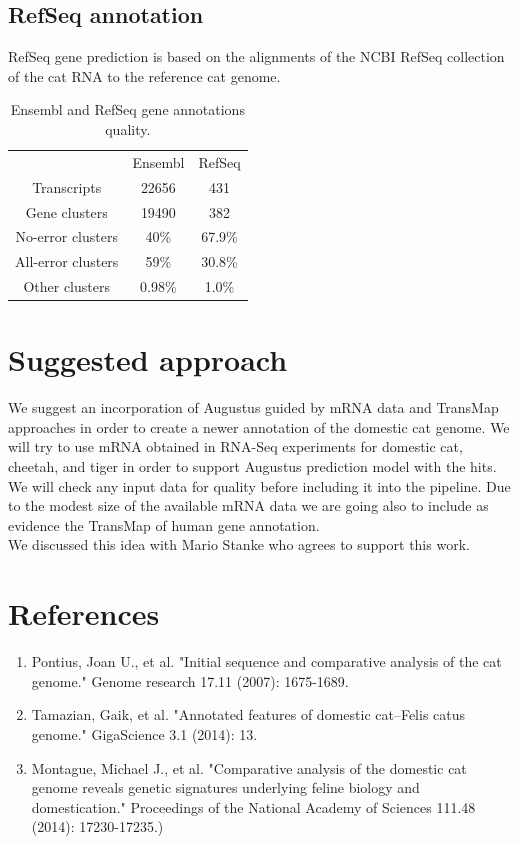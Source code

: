 \documentclass{article}
\begin{document}
\subsection{RefSeq annotation}
RefSeq gene prediction is based on the alignments of the NCBI RefSeq collection of the cat RNA to the reference cat genome.

\begin{table}
\centering
\begin{tabular}{| c | c | c |}
\hline
&Ensembl&RefSeq\\

Transcripts& 22656 & 431\\

Gene clusters& 19490 & 382\\

No-error clusters & 40\% & 67.9\%\\

All-error clusters& 59\% & 30.8\%\\

Other clusters& 0.98\% & 1.0\%\\
\hline
\end{tabular}
\caption{Ensembl and RefSeq gene annotations quality.}
\label{table:ensembl_refseq_stats}
\end{table}

\section{Suggested approach}
We suggest an incorporation of Augustus guided by mRNA data and TransMap approaches in order to create a newer annotation of the domestic cat genome.
We will try to use mRNA obtained in RNA-Seq experiments for domestic cat, cheetah, and tiger in order to support Augustus prediction model with the hits. We will check any input data for quality before including it into the pipeline. Due to the modest size of the available mRNA data we are going also to include as evidence the TransMap of human gene annotation.\\
We discussed this idea with Mario Stanke who agrees to support this work. 

\section{References}

\begin{enumerate}
\item Pontius, Joan U., et al. "Initial sequence and comparative analysis of the cat genome." Genome research 17.11 (2007): 1675-1689.
\item Tamazian, Gaik, et al. "Annotated features of domestic cat–Felis catus genome." GigaScience 3.1 (2014): 13.
\item Montague, Michael J., et al. "Comparative analysis of the domestic cat genome reveals genetic signatures underlying feline biology and domestication." Proceedings of the National Academy of Sciences 111.48 (2014): 17230-17235.)
\end{enumerate}
\end{document}
